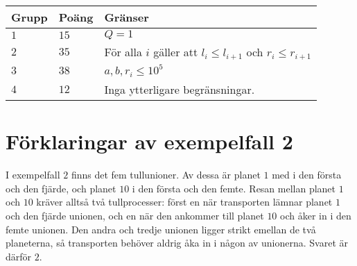 \noindent
\begin{tabular}{| l | l | l |}
  \hline
  \textbf{Grupp} & \textbf{Poäng} & \textbf{Gränser} \\ \hline
  $1$   & $15$       & $Q=1$  \\ \hline
  $2$   & $35$       & För alla $i$ gäller att $l_i \le l_{i + 1}$ och $r_i \le r_{i+1}$ \\ \hline
  $3$   & $38$       & $ a,b,r_i \leq 10^5$ \\ \hline
  $4$   & $12$       & Inga ytterligare begränsningar. \\ \hline
\end{tabular}

\section*{Förklaringar av exempelfall 2}
I exempelfall $2$ finns det fem tullunioner.
Av dessa är planet $1$ med i den första och den fjärde, och planet $10$ i den första och den femte.
Resan mellan planet $1$ och $10$ kräver alltså två tullprocesser: först en när transporten lämnar planet $1$ och den fjärde unionen, och en när den ankommer till planet $10$ och åker in i den femte unionen.
Den andra och tredje unionen ligger strikt emellan de två planeterna, så transporten behöver aldrig åka in i någon av unionerna.
Svaret är därför $2$.
